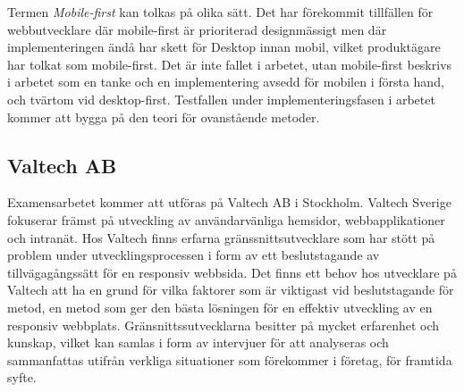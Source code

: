 \documentclass[11pt]{article}
\begin{document}
Termen \textit{Mobile-first} kan tolkas på olika sätt. Det har förekommit tillfällen för webbutvecklare där mobile-first är prioriterad designmässigt men där implementeringen ändå har skett för Desktop innan mobil, vilket produktägare har tolkat som mobile-first. Det är inte fallet i arbetet, utan mobile-first beskrivs i arbetet som en tanke och en implementering avsedd för mobilen i första hand, och tvärtom vid desktop-first. Testfallen under implementeringsfasen i arbetet kommer att bygga på den teori för ovanstående metoder.

\newpage

\subsection{Valtech AB}
Examensarbetet kommer att utföras på Valtech AB i Stockholm. Valtech Sverige fokuserar främst på utveckling av användarvänliga hemsidor, webbapplikationer och intranät. Hos Valtech finns erfarna gränssnittsutvecklare som har stött på problem under utvecklingsprocessen i form av ett beslutstagande av tillvägagångssätt för en responsiv webbsida. Det finns ett behov hos utvecklare på Valtech att ha en grund för vilka faktorer som är viktigast vid beslutstagande för metod, en metod som ger den bästa lösningen för en effektiv utveckling av en responsiv webbplats. Gränsnittssutvecklarna besitter på mycket erfarenhet och kunskap, vilket kan samlas i form av intervjuer för att analyseras och sammanfattas utifrån verkliga situationer som förekommer i företag, för framtida syfte.
\end{document}
